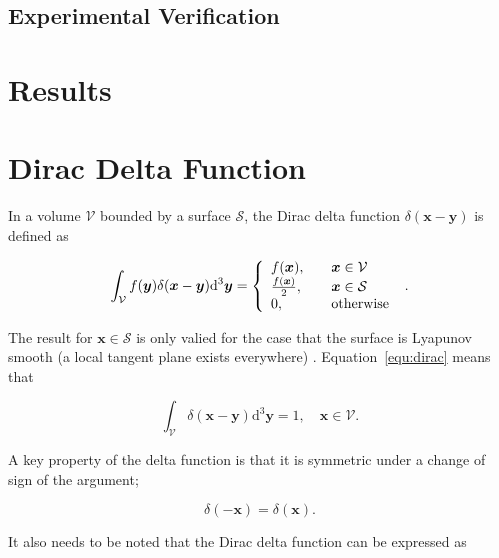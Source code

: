 \documentclass[12pt]{article}
\begin{document}
\subsection{Experimental Verification}
\label{subsec:exp_verif}


\section{Results}
\label{sec:res}


\appendix

\section{Dirac Delta Function}
\label{app:delta}

In a volume $\mathcal{V}$ bounded by a surface $\mathcal{S}$, the Dirac delta function $\delta(\boldsymbol{x} - \boldsymbol{y})$ is defined as \citep{Riley06}

\begin{equation}
\label{equ:dirac}
\int_{\mathcal{V}} f(\boldsymbol{y}) \delta(\boldsymbol{x} - \boldsymbol{y}) \mathrm{d}^{3} \boldsymbol{y} = \left\{
    \begin{array}{l l}
      f(\boldsymbol{x}), &\quad \boldsymbol{x} \in \mathcal{V} \\
      \frac{f(\boldsymbol{x})}{2}, &\quad \boldsymbol{x} \in \mathcal{S} \\
      0, & \quad \text{otherwise}
\end{array}
\right.\ .
\end{equation}

The result for $\boldsymbol{x} \in \mathcal{S}$ is only valied for the case that the surface is Lyapunov smooth (a local tangent plane exists everywhere) \citep{Gunter67}. Equation~\ref{equ:dirac} means that

\begin{equation}
\label{equ:delta_int}
\int_{\mathcal{V}} \delta(\boldsymbol{x} - \boldsymbol{y}) \mathrm{d}^{3} \boldsymbol{y} = 1, \quad \boldsymbol{x} \in \mathcal{V}.
\end{equation}

A key property of the delta function is that it is symmetric under a change of sign of the argument;

\begin{equation}
\label{equ:delta_sym}
\delta(-\boldsymbol{x}) = \delta(\boldsymbol{x}).
\end{equation}

It also needs to be noted that the Dirac delta function can be expressed as \citep{Riley06}
\end{document}
